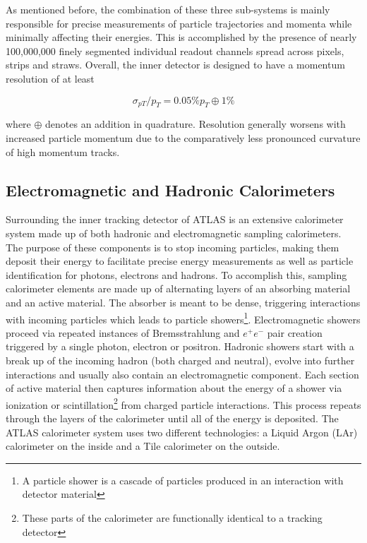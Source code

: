 As mentioned before, the combination of these three sub-systems is mainly responsible for precise measurements of 
particle trajectories and momenta while minimally affecting their energies. This is accomplished by the presence of 
nearly 100,000,000 finely segmented individual readout channels spread across pixels, strips and straws. Overall, the 
inner detector is designed to have a momentum resolution of at least

\begin{equation}
\sigma_{pT}/p_T = 0.05\% p_T \oplus 1\%
\end{equation}

where $\oplus$ denotes an addition in quadrature. Resolution generally worsens with increased particle momentum due to 
the comparatively less pronounced curvature of high momentum tracks.

\subsection{Electromagnetic and Hadronic Calorimeters}

Surrounding the inner tracking detector of ATLAS is an extensive calorimeter system made up of both hadronic and 
electromagnetic sampling calorimeters. The purpose of these components is to stop incoming particles, making them 
deposit their energy to facilitate precise energy measurements as well as particle identification for photons, 
electrons and hadrons. To accomplish this, sampling calorimeter elements are made up of alternating layers of an 
absorbing material and an active material. The absorber is meant to be dense, triggering interactions with incoming 
particles which leads to particle showers\footnote{A particle shower is a cascade of particles produced in an 
interaction with detector material}. Electromagnetic showers proceed via repeated instances of Bremsstrahlung and 
$e^+e^-$ pair creation triggered by a single photon, electron or positron. Hadronic showers start with a break up of 
the incoming hadron (both charged and neutral), evolve into further interactions and usually also contain an 
electromagnetic component. Each section of active material then captures information about the energy of a shower 
via ionization or scintillation\footnote{These parts of the calorimeter are functionally identical to a tracking 
detector} from charged particle interactions. This process repeats through the layers of the calorimeter until all of 
the energy is deposited. The ATLAS calorimeter system uses two different technologies: a Liquid Argon (LAr) 
calorimeter on the inside and a Tile calorimeter on the outside. \par

